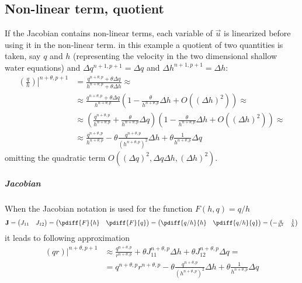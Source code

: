 \subsection{Non-linear term, quotient}\label{sec:jacobians_with_non_linear_quotient_term}
If the Jacobian contains non-linear terms, each variable of $\vec{u}$ is linearized before using it in the non-linear term.
in this example a quotient of two quantities is taken, say $q$ and $h$ (representing the velocity in the two dimensional shallow water equations) and  $\Delta q^{n+1, p+1} = \Delta q$ and  $\Delta h^{n+1, p+1} = \Delta h$:
\begin{align}
    \left.\left(\frac{q}{h}\right)\right|^{n+\theta, p+1} & = \frac{ q^{n+\theta, p} + \theta  \Delta q }{ h^{n+\theta, p} + \theta  \Delta h} \approx
    \\
    & \approx \frac{ q^{n+\theta, p} + \theta  \Delta q }{ h^{n+\theta, p}} \left( 1 - \frac{\theta}{h^{n+\theta, p}} \Delta h  + O\left(  (\Delta h)^2 \right) \right)  \approx
    \\
    & \approx \left( \frac{ q^{n+\theta, p}}{ h^{n+\theta, p}} + \frac{\theta}{ h^{n+\theta, p}}  \Delta q \right)
    \left( 1 - \frac{\theta}{h^{n+\theta, p}} \Delta h  + O\left(  (\Delta h)^2 \right) \right)  \approx
    \\
    & \approx  \frac{ q^{n+\theta, p}}{ h^{n+\theta, p}}  - \theta \frac{ q^{n+\theta, p}}{ (h^{n+\theta, p})^2} \Delta h + \theta\frac{1}{ h^{n+\theta, p}}  \Delta q
\end{align}
omitting the quadratic term $O((\Delta q)^2, \Delta q \Delta h, (\Delta h)^2)$.
\subparagraph*{Jacobian}
When the Jacobian notation is  used for the function $F(h,q) = q/h$
\begin{align}
    \mat{J} =
    \begin{pmatrix}
        J_{11} & J_{12}
    \end{pmatrix}
    =
    \begin{pmatrix}
        \pdiff{F}{h} & \pdiff{F}{q}
    \end{pmatrix}
    =
    \begin{pmatrix}
        \pdiff{q/h}{h} & \pdiff{q/h}{q}
    \end{pmatrix}
    =
    \begin{pmatrix}
        -\frac{q}{h^2} & \frac{1}{h}
    \end{pmatrix}
\end{align}
it leads to following approximation
\begin{align}
    \left.(qr)\right|^{n+\theta, p+1} &  \approx  \frac{q^{n+\theta, p}}{r^{n+\theta, p}} + \theta J_{11}^{n+\theta, p} \Delta h + \theta J_{12}^{n+\theta, p} \Delta q =
    \\
    & = q^{n+\theta, p} r^{n+\theta, p} - \theta \frac{q^{n+\theta, p}}{(h^{n+\theta, p})^2} \Delta h + \theta \frac{1}{h^{n+\theta, p}} \Delta q
\end{align}
